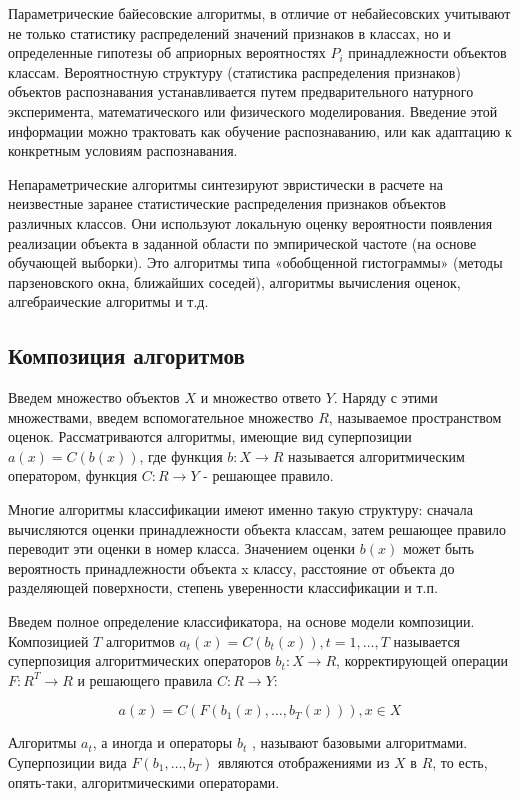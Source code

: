 Параметрические байесовские алгоритмы, в отличие от небайесовских учитывают не только статистику распределений значений признаков в классах, но и определенные гипотезы об априорных вероятностях $P_i$ принадлежности объектов классам. Вероятностную структуру (статистика распределения признаков) объектов распознавания устанавливается путем предварительного натурного эксперимента, математического или физического моделирования. Введение этой информации можно трактовать как обучение распознаванию, или как адаптацию к конкретным условиям распознавания. 

Непараметрические алгоритмы синтезируют эвристически в расчете на неизвестные заранее статистические распределения признаков объектов различных классов. Они используют локальную оценку вероятности появления реализации объекта в заданной области по эмпирической частоте (на основе обучающей выборки). Это алгоритмы типа «обобщенной гистограммы» (методы парзеновского окна, ближайших соседей), алгоритмы вычисления оценок, алгебраические алгоритмы и т.д.

\subsection{Композиция алгоритмов}
Введем множество объектов $X$ и множество ответо $Y$. Наряду с этими множествами, введем вспомогательное множество $R$, называемое пространством оценок. Рассматриваются алгоритмы, имеющие вид суперпозиции $a(x)=C(b(x))$, где функция $b: X \to R$ называется алгоритмическим оператором, функция $C: R \to Y$ - решающее правило. 

Многие алгоритмы классификации имеют именно такую структуру: сначала вычисляются оценки принадлежности объекта классам, затем решающее правило переводит эти оценки в номер класса. Значением оценки $b(x)$ может быть вероятность принадлежности объекта x классу, расстояние от объекта до разделяющей поверхности, степень уверенности классификации и т.п.

Введем полное определение классификатора, на основе модели композиции. Композицией $T$ алгоритмов $a_t(x)= C(b_t(x)), t=1,\dotsc,T$ называется суперпозиция алгоритмических операторов $b_t: X \to R$, корректирующей операции  $F: R^T \to R$ и решающего правила $C: R \to Y$:


\begin{equation}
	a(x) = C(F(b_1(x),\dotsc,b_T(x))), x \in X
\end{equation}

Алгоритмы $a_t$, а иногда и операторы $b_t$ , называют базовыми алгоритмами. 
Суперпозиции вида $F(b_1,\dotsc, b_T)$ являются отображениями из $X$ в $R$, то есть, опять-таки, алгоритмическими операторами. 

